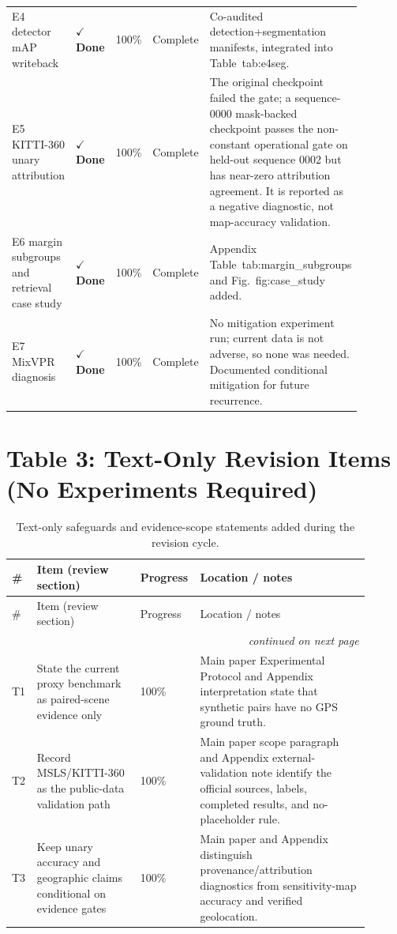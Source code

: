 \documentclass[11pt]{article}
\newcommand{\done}{\textcolor{DoneGreen}{\textbf{$\checkmark$ Done}}}
\begin{document}
\begin{longtable}{@{}p{0.14\linewidth}p{0.15\linewidth}p{0.10\linewidth}p{0.18\linewidth}p{0.31\linewidth}@{}}
E4 detector mAP writeback & \done & 100\% & Complete & Co-audited detection+segmentation manifests, integrated into Table~tab:e4seg. \\
E5 KITTI-360 unary attribution & \done & 100\% & Complete & The original checkpoint failed the gate; a sequence-0000 mask-backed checkpoint passes the non-constant operational gate on held-out sequence 0002 but has near-zero attribution agreement. It is reported as a negative diagnostic, not map-accuracy validation. \\
E6 margin subgroups and retrieval case study & \done & 100\% & Complete & Appendix Table~tab:margin\_subgroups and Fig.~fig:case\_study added. \\
E7 MixVPR diagnosis & \done & 100\% & Complete & No mitigation experiment run; current data is not adverse, so none was needed. Documented conditional mitigation for future recurrence. \\
\end{longtable}

\section*{Table 3: Text-Only Revision Items (No Experiments Required)}

\begin{longtable}{@{}p{0.05\linewidth}p{0.28\linewidth}p{0.11\linewidth}p{0.46\linewidth}@{}}
\caption{Text-only safeguards and evidence-scope statements added during the
revision cycle.}
\label{tab:textonly}\\
\toprule
\# & Item (review section) & Progress & Location / notes \\
\midrule
\endfirsthead
\toprule
\# & Item (review section) & Progress & Location / notes \\
\midrule
\endhead
\midrule
\multicolumn{4}{r}{\itshape continued on next page} \\
\endfoot
\bottomrule
\endlastfoot
T1 & State the current proxy benchmark as paired-scene evidence only & 100\% & Main paper Experimental Protocol and Appendix interpretation state that synthetic pairs have no GPS ground truth. \\
T2 & Record MSLS/KITTI-360 as the public-data validation path & 100\% & Main paper scope paragraph and Appendix external-validation note identify the official sources, labels, completed results, and no-placeholder rule. \\
T3 & Keep unary accuracy and geographic claims conditional on evidence gates & 100\% & Main paper and Appendix distinguish provenance/attribution diagnostics from sensitivity-map accuracy and verified geolocation. \\
\end{longtable}
\end{document}
